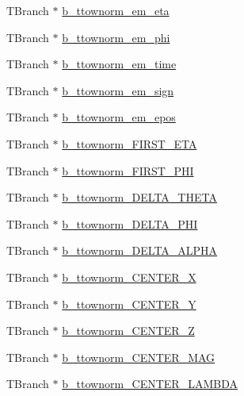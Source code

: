 \begin{DoxyCompactItemize}
\item 
T\+Branch $\ast$ \hyperlink{classCollectionTree_a7065717433a661a1b8468545f683abff}{b\+\_\+ttownorm\+\_\+em\+\_\+eta}
\item 
T\+Branch $\ast$ \hyperlink{classCollectionTree_a2804e1f56e3048cc21a461f8fd0ecf7f}{b\+\_\+ttownorm\+\_\+em\+\_\+phi}
\item 
T\+Branch $\ast$ \hyperlink{classCollectionTree_ae7a70fbab072f417cfc808a7e4fa5919}{b\+\_\+ttownorm\+\_\+em\+\_\+time}
\item 
T\+Branch $\ast$ \hyperlink{classCollectionTree_aa2a442f65bc4b2d5281bf5011e4e2563}{b\+\_\+ttownorm\+\_\+em\+\_\+sign}
\item 
T\+Branch $\ast$ \hyperlink{classCollectionTree_aaa2b939d3939b7739bd5428105ce28df}{b\+\_\+ttownorm\+\_\+em\+\_\+epos}
\item 
T\+Branch $\ast$ \hyperlink{classCollectionTree_a81c25a2455d0b14dfd04e4904a893d43}{b\+\_\+ttownorm\+\_\+\+F\+I\+R\+S\+T\+\_\+\+E\+TA}
\item 
T\+Branch $\ast$ \hyperlink{classCollectionTree_a81ab9373de2f7c1c1cc9a4db9b6e8273}{b\+\_\+ttownorm\+\_\+\+F\+I\+R\+S\+T\+\_\+\+P\+HI}
\item 
T\+Branch $\ast$ \hyperlink{classCollectionTree_a761a43cce2353f84dd28be61cfaa959f}{b\+\_\+ttownorm\+\_\+\+D\+E\+L\+T\+A\+\_\+\+T\+H\+E\+TA}
\item 
T\+Branch $\ast$ \hyperlink{classCollectionTree_a81b6d6642424ccbddbf4fe4958da8514}{b\+\_\+ttownorm\+\_\+\+D\+E\+L\+T\+A\+\_\+\+P\+HI}
\item 
T\+Branch $\ast$ \hyperlink{classCollectionTree_a55f936108c039be3afc3f8fbf9666ead}{b\+\_\+ttownorm\+\_\+\+D\+E\+L\+T\+A\+\_\+\+A\+L\+P\+HA}
\item 
T\+Branch $\ast$ \hyperlink{classCollectionTree_a7b1e5780ebde2bbb46d67c0c80fffaec}{b\+\_\+ttownorm\+\_\+\+C\+E\+N\+T\+E\+R\+\_\+X}
\item 
T\+Branch $\ast$ \hyperlink{classCollectionTree_a02783b3122ae0c5deed98925a6ee3ae2}{b\+\_\+ttownorm\+\_\+\+C\+E\+N\+T\+E\+R\+\_\+Y}
\item 
T\+Branch $\ast$ \hyperlink{classCollectionTree_a3351fe2e8a29ae0b275ba7d0b0bb867f}{b\+\_\+ttownorm\+\_\+\+C\+E\+N\+T\+E\+R\+\_\+Z}
\item 
T\+Branch $\ast$ \hyperlink{classCollectionTree_a1818bc36679cbf8abe2402bddab10df1}{b\+\_\+ttownorm\+\_\+\+C\+E\+N\+T\+E\+R\+\_\+\+M\+AG}
\item 
T\+Branch $\ast$ \hyperlink{classCollectionTree_ac5ff16e1a247f3cc8b091094e5e94c7f}{b\+\_\+ttownorm\+\_\+\+C\+E\+N\+T\+E\+R\+\_\+\+L\+A\+M\+B\+DA}

\end{DoxyCompactItemize}

